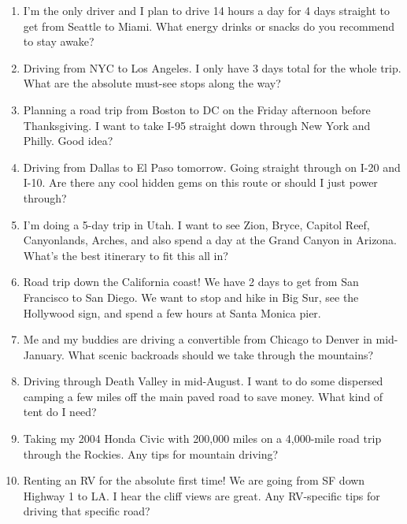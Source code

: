 \documentclass[12pt]{article}
\begin{document}
\begin{enumerate}
    \item I'm the only driver and I plan to drive 14 hours a day for 4 days straight to get from Seattle to Miami. What energy drinks or snacks do you recommend to stay awake?
    \item Driving from NYC to Los Angeles. I only have 3 days total for the whole trip. What are the absolute must-see stops along the way?
    \item Planning a road trip from Boston to DC on the Friday afternoon before Thanksgiving. I want to take I-95 straight down through New York and Philly. Good idea?
    \item Driving from Dallas to El Paso tomorrow. Going straight through on I-20 and I-10. Are there any cool hidden gems on this route or should I just power through?
    \item I'm doing a 5-day trip in Utah. I want to see Zion, Bryce, Capitol Reef, Canyonlands, Arches, and also spend a day at the Grand Canyon in Arizona. What's the best itinerary to fit this all in?
    \item Road trip down the California coast! We have 2 days to get from San Francisco to San Diego. We want to stop and hike in Big Sur, see the Hollywood sign, and spend a few hours at Santa Monica pier.
    \item Me and my buddies are driving a convertible from Chicago to Denver in mid-January. What scenic backroads should we take through the mountains?
    \item Driving through Death Valley in mid-August. I want to do some dispersed camping a few miles off the main paved road to save money. What kind of tent do I need?
    \item Taking my 2004 Honda Civic with 200,000 miles on a 4,000-mile road trip through the Rockies. Any tips for mountain driving?
    \item Renting an RV for the absolute first time! We are going from SF down Highway 1 to LA. I hear the cliff views are great. Any RV-specific tips for driving that specific road?
\end{enumerate}
\end{document}
